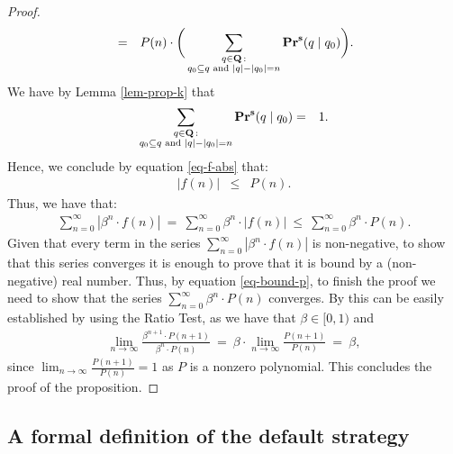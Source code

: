 \begin{proof}
\begin{eqnarray}
\label{eq-f-abs}
& = & P(n) \cdot \bigg(\sum_{\substack{q \in \mathbf{Q} \,: \\ q_0 \subseteq q \text{ {\rm and} } |q| - |q_0| = n}} \mathbf{Pr}^{\mathbf{s}}(q \mid q_0)\bigg).
\end{eqnarray}
We have by Lemma \ref{lem-prop-k} that
\begin{eqnarray*}
\sum_{\substack{q \in \mathbf{Q} \,: \\ q_0 \subseteq q \text{ {\rm and} } |q| - |q_0| = n}} \mathbf{Pr}^{\mathbf{s}}(q \mid q_0) & = & 1.
\end{eqnarray*}
Hence, we conclude by equation \eqref{eq-f-abs} that:
\begin{eqnarray*}
|f(n)| & \leq & P(n).
\end{eqnarray*}
Thus, we have that:
\begin{eqnarray}\label{eq-bound-p}
\sum_{n=0}^\infty |\beta^n \cdot f(n)| \ = \ \sum_{n=0}^\infty \beta^n \cdot |f(n)|
\ \leq \ \sum_{n=0}^\infty \beta^n \cdot P(n).
\end{eqnarray}
Given that every term in the series $\sum_{n=0}^\infty |\beta^n \cdot f(n)|$ is non-negative, to show that this series converges it is enough to prove that it is bound by a (non-negative) real number. Thus, by equation \eqref{eq-bound-p}, to finish the proof we need to show that the series $\sum_{n=0}^\infty \beta^n \cdot P(n)$ converges. By this can be easily established by using the Ratio Test, as we have that $\beta \in [0,1)$ and
\begin{eqnarray*}
\lim_{n \to \infty} \frac{\beta^{n+1} \cdot P(n+1)}{\beta^{n} \cdot P(n)} \ = \ \beta \cdot \lim_{n \to \infty} \frac{P(n+1)}{P(n)}
\ = \ \beta,
\end{eqnarray*}
since $\lim_{n \to \infty} \frac{P(n+1)}{P(n)} = 1$ as $P$ is a nonzero polynomial.
This concludes the proof of the proposition.
\end{proof}

\subsection{A formal definition of the default strategy}
\label{sec-def-default}

